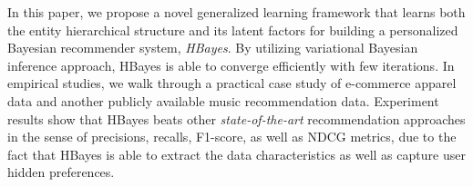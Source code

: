 In this paper, we propose a novel generalized learning framework that learns both the entity hierarchical structure and its latent factors for building a personalized Bayesian recommender system, \emph{HBayes}.  
By utilizing variational Bayesian inference approach, HBayes is able to converge efficiently with few iterations.  In empirical studies, we walk through a practical case study of e-commerce apparel data and another publicly available music recommendation data.  Experiment results show that HBayes beats other \emph{state-of-the-art} recommendation approaches in the sense of precisions, recalls, F1-score, as well as NDCG metrics, due to the fact that HBayes is able to extract the data characteristics as well as capture user hidden preferences.   